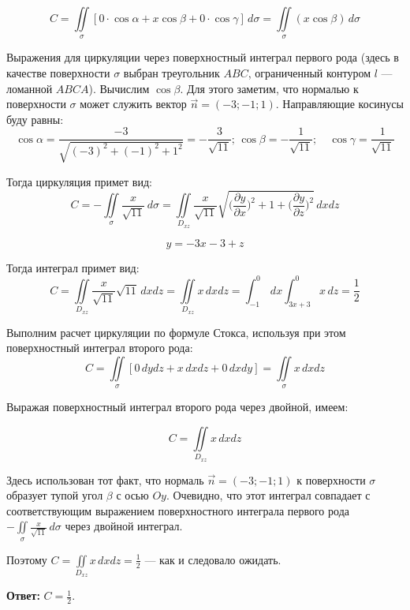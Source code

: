 \documentclass[12pt]{article}
\begin{document}
	$$ C = \iint \limits_{\sigma} [ 0 \cdot \cos{\alpha} + x \cos{\beta} + 0 \cdot \cos{\gamma} ] \, d\sigma = \iint \limits_{\sigma} ( x \cos{\beta} ) \, d\sigma $$

	Выражения для циркуляции через поверхностный интеграл первого рода (здесь в качестве поверхности $ \sigma $ выбран треугольник $ ABC $, ограниченный контуром $ l $ --- ломанной $ ABCA $). Вычислим $ \cos{\beta} $. Для этого заметим, что нормалью к поверхности $ \sigma $ может служить вектор $ \vec{n} = (-3;-1;1)$. Направляющие косинусы буду равны: 
	$$ \cos{\alpha} = \frac{-3}{\sqrt{ (-3)^2 + (-1)^2 + 1^2 }} = -\frac{ 3 }{ \sqrt{ 11 } }; \, \cos\beta = - \frac{1}{\sqrt{11}};\quad \cos\gamma = \frac{1}{\sqrt{11}} $$
	
	Тогда циркуляция примет вид: 
	$$ C = - \iint \limits_{\sigma}  \frac{x}{\sqrt{11}}  \, d\sigma  = \iint \limits_{D_{xz}}  \frac{x}{\sqrt{11}} \sqrt{ \Big(\frac{\partial y}{\partial x}\Big)^2 + 1 + \Big(\frac{\partial y}{\partial z } \Big)^2 } \, dxdz  $$

	$$ y = - 3x - 3 + z $$

	Тогда интеграл примет вид:
	$$ C = \iint \limits_{D_{xz}}  \frac{x}{\sqrt{11}} \sqrt{11} \, dxdz = \iint \limits_{D_{xz}}  x \, dxdz = \int_{-1}^{0} \, dx \int_{3x+3}^{0} x \, dz = \frac{1}{2}$$

	Выполним расчет циркуляции по формуле Стокса, используя при этом поверхностный интеграл второго рода: 
	$$ C = \iint \limits_{\sigma} [ 0 \, dydz + x \, dxdz + 0 \, dxdy ] = \iint \limits_{\sigma} x \, dxdz $$

	Выражая поверхностный интеграл второго рода через двойной, имеем:

	$$ C = \iint \limits_{D_{xz}} x \, dxdz $$

	Здесь использован тот факт, что нормаль $ \vec{n} = (-3;-1;1)$ к поверхности $ \sigma $ образует тупой угол $ \beta $ с осью $ Oy $. Очевидно, что этот интеграл совпадает с соответствующим выражением поверхностного интеграла первого рода $ - \iint \limits_{\sigma}  \frac{x}{\sqrt{11}}  \, d\sigma $ через двойной интеграл.

	Поэтому $ C = \iint \limits_{D_{xz}} x \, dxdz = \frac{1}{2} $ --- как и следовало ожидать.

	\hspace{290pt}\textbf{Ответ:} $ C = \frac{1}{2}.$
	
\end{document}

